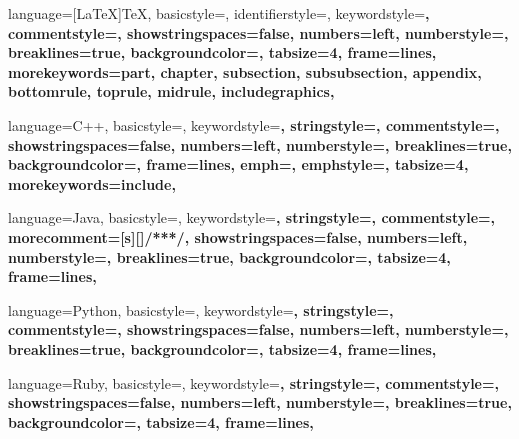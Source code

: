 \makeatletter
{}
\makeatother
\setlength{\parindent}{1.3cm}
\setlength{\parskip}{0.2cm}
\makeindex

 {
  language={[LaTeX]TeX},
  basicstyle=\ttfamily\small,
  identifierstyle=\color{black},
  keywordstyle=\color{blue}\bfseries,
  commentstyle=\color{comentary},
  showstringspaces=false,
  numbers=left,
  numberstyle=\tiny,
  breaklines=true,
  backgroundcolor=\color{white},
  tabsize=4,
  frame=lines,
  morekeywords={part, chapter, subsection, subsubsection, appendix, bottomrule, toprule, midrule, includegraphics},
}

 {
  language=C++,
  basicstyle=\ttfamily\small,
  keywordstyle=\color{blue}\bfseries,
  stringstyle=\color{string},
  commentstyle=\color{comentary},
  showstringspaces=false,
  numbers=left,
  numberstyle=\tiny,
  breaklines=true,
  backgroundcolor=\color{white},
  frame=lines,
  emph={},
  emphstyle={\color{blue}\bfseries},
  tabsize=4,
  morekeywords={include},
}

 {
  language=Java,
  basicstyle=\ttfamily\small,
  keywordstyle=\color{blue}\bfseries,
  stringstyle=\color{string},
  commentstyle=\color{comentary},
  morecomment=[s][\color{blue}]{/**}{*/},
  showstringspaces=false,
  numbers=left,
  numberstyle=\tiny,
  breaklines=true,
  backgroundcolor=\color{white},
  tabsize=4,
  frame=lines,
}

 {
  language=Python,
  basicstyle=\ttfamily\small,
  keywordstyle=\color{blue}\bfseries,
  stringstyle=\color{string},
  commentstyle=\color{comentary},
  showstringspaces=false,
  numbers=left,
  numberstyle=\tiny,
  breaklines=true,
  backgroundcolor=\color{white},
  tabsize=4,
  frame=lines,
}

 {
  language=Ruby,
  basicstyle=\ttfamily\small,
  keywordstyle=\color{blue}\bfseries,
  stringstyle=\color{string},
  commentstyle=\color{comentary},
  showstringspaces=false,
  numbers=left,
  numberstyle=\tiny,
  breaklines=true,
  backgroundcolor=\color{white},
  tabsize=4,
  frame=lines,
}

